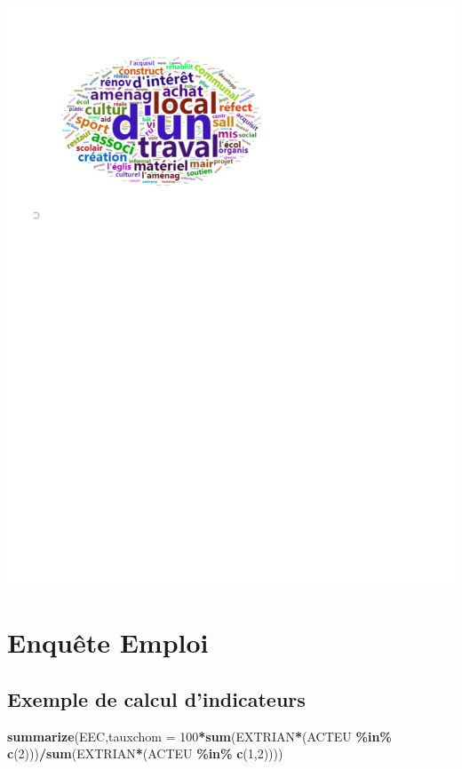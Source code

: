 \documentclass[
]{book}
\newenvironment{Shaded}{\begin{snugshade}}{\end{snugshade}}
\newcommand{\AttributeTok}[1]{\textcolor[rgb]{0.13,0.29,0.53}{#1}}
\newcommand{\DecValTok}[1]{\textcolor[rgb]{0.00,0.00,0.81}{#1}}
\newcommand{\FunctionTok}[1]{\textcolor[rgb]{0.13,0.29,0.53}{\textbf{#1}}}
\newcommand{\NormalTok}[1]{#1}
\newcommand{\SpecialCharTok}[1]{\textcolor[rgb]{0.81,0.36,0.00}{\textbf{#1}}}
\begin{document}
\includegraphics{_main_files/figure-latex/reserve20-1.pdf}

\hypertarget{enquuxeate-emploi}{%
\chapter{Enquête Emploi}\label{enquuxeate-emploi}}

\hypertarget{exemple-de-calcul-dindicateurs}{%
\section{Exemple de calcul d'indicateurs}\label{exemple-de-calcul-dindicateurs}}

\begin{Shaded}
\begin{Highlighting}[]
\FunctionTok{summarize}\NormalTok{(EEC,}\AttributeTok{tauxchom =} \DecValTok{100}\SpecialCharTok{*}\FunctionTok{sum}\NormalTok{(EXTRIAN}\SpecialCharTok{*}\NormalTok{(ACTEU }\SpecialCharTok{\%in\%} \FunctionTok{c}\NormalTok{(}\DecValTok{2}\NormalTok{)))}\SpecialCharTok{/}\FunctionTok{sum}\NormalTok{(EXTRIAN}\SpecialCharTok{*}\NormalTok{(ACTEU }\SpecialCharTok{\%in\%} \FunctionTok{c}\NormalTok{(}\DecValTok{1}\NormalTok{,}\DecValTok{2}\NormalTok{))))}
\end{Highlighting}
\end{Shaded}
\end{document}
